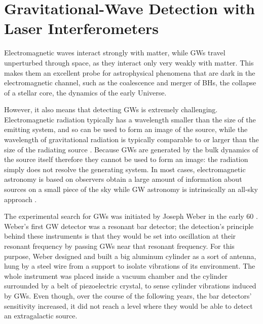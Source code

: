 \documentclass[binding=0.6cm, LaM]{sapthesis}
\begin{document}
\section{Gravitational-Wave Detection with Laser Interferometers}

	Electromagnetic waves interact strongly with matter, while GWs travel unperturbed through space,
        as they interact only very weakly with matter. This makes them an excellent probe for astrophysical phenomena that are dark
        in the electromagnetic channel, such as the coalescence and merger of BHs, the collapse of a stellar core,
        the dynamics of the early Universe.

	However, it also means that detecting GWs is extremely challenging.
        Electromagnetic radiation typically has a wavelength smaller than the size of the emitting system,
        and so can be used to form an image of the source, while the wavelength of gravitational radiation is typically comparable
        to or larger than the size of the radiating source \cite{18}. 
        Because GWs are generated by the bulk dynamics of the source itself therefore they cannot be used to form an image:
        the radiation simply does not resolve the generating system.
        In most cases, electromagnetic astronomy is based on observers obtain a large amount of information about sources on a small piece
        of the sky while GW astronomy is intrinsically an all-sky approach \cite{4}.

	The experimental search for GWs was initiated by Joseph Weber in the early 60 \cite{7}.
	Weber’s first GW detector was a resonant bar detector; 
	the detection’s principle behind these instruments is that 
	they would be set into oscillation at their resonant frequency 
	by passing GWs near that resonant frequency.
	For this purpose, Weber designed and built a big aluminum cylinder as a sort of antenna, 
	hung by a steel wire from a support to isolate vibrations of its environment. 
	The whole instrument was placed inside a vacuum chamber 
	and the cylinder surrounded by a belt of piezoelectric crystal, 
	to sense cylinder vibrations induced by GWs.
	Even though, over the course of the following years, the bar detectors’ sensitivity increased, 
	it did not reach a level where they would be able to detect an extragalactic source.
\end{document}
